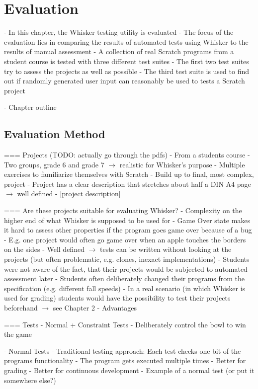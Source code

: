 \chapter{Evaluation}

- In this chapter, the Whisker testing utility is evaluated
- The focus of the evaluation lies in comparing the results of automated tests using Whisker to the results of manual assessment
- A collection of real Scratch programs from a student course is tested with three different test suites
- The first two test suites try to assess the projects as well as possible
- The third test suite is used to find out if randomly generated user input can reasonably be used to tests a Scratch project

- Chapter outline

\section{Evaluation Method}
=== Projects (TODO: actually go through the pdfs)
- From a students course
- Two groups, grade 6 and grade 7 $\rightarrow$ realistic for Whisker's purpose
- Multiple exercises to familiarize themselves with Scratch
- Build up to final, most complex, project
- Project has a clear description that stretches about half a DIN A4 page $\rightarrow$ well defined
- [project description]

=== Are these projects suitable for evaluating Whisker?
- Complexity on the higher end of what Whisker is supposed to be used for
- Game Over state makes it hard to assess other properties if the program goes game over because of a bug
    - E.g. one project would often go game over when an apple touches the borders on the sides
    - Well defined $\rightarrow$ tests can be written without looking at the projects (but often problematic, e.g. clones, inexact implementations)
- Students were not aware of the fact, that their projects would be subjected to automated assessment later
    - Students often deliberately changed their programs from the specification (e.g. different fall speeds)
    - In a real scenario (in which Whisker is used for grading) students would have the possibility to test their projects beforehand
    $\rightarrow$ see Chapter 2 - Advantages

=== Tests
- Normal + Constraint Tests
    - Deliberately control the bowl to win the game

- Normal Tests
    - Traditional testing approach: Each test checks one bit of the programs functionality
    - The program gets executed multiple times
    - Better for grading
    - Better for continuous development
    - Example of a normal test (or put it somewhere else?)


